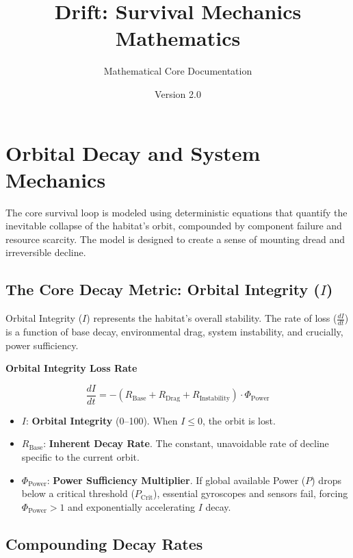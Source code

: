 \documentclass{article}
\title{\color{DeepVoid}\textbf{Drift: Survival Mechanics Mathematics}}
\author{\large Mathematical Core Documentation}
\date{Version 2.0}
\newenvironment{mathbox}[1][\unskip]{
    \begin{tcolorbox}
    \textbf{#1}
}{
    \end{tcolorbox}
}
\begin{document}
\maketitle
\thispagestyle{empty} %

\section*{Orbital Decay and System Mechanics}

The core survival loop is modeled using deterministic equations that quantify the inevitable collapse of the habitat's orbit, compounded by component failure and resource scarcity. The model is designed to create a sense of mounting dread and irreversible decline.

\subsection{The Core Decay Metric: Orbital Integrity ($I$)}\hspace{0.5em}

Orbital Integrity ($I$) represents the habitat's overall stability. The rate of loss ($\frac{dI}{dt}$) is a function of base decay, environmental drag, system instability, and crucially, power sufficiency.

\begin{mathbox}[\color{DeepVoid}Orbital Integrity Loss Rate]
$$
\frac{dI}{dt} = - (R_{\text{Base}} + R_{\text{Drag}} + R_{\text{Instability}}) \cdot \Phi_{\text{Power}}
$$
\end{mathbox}

\begin{itemize}
    \item $I$: \textbf{Orbital Integrity} (0--100). When $I \le 0$, the orbit is lost.
    \item $R_{\text{Base}}$: \textbf{Inherent Decay Rate}. The constant, unavoidable rate of decline specific to the current orbit.
    \item $\Phi_{\text{Power}}$: \textbf{Power Sufficiency Multiplier}. If global available Power ($P$) drops below a critical threshold ($P_{\text{Crit}}$), essential gyroscopes and sensors fail, forcing $\Phi_{\text{Power}} > 1$ and exponentially accelerating $I$ decay.
\end{itemize}

\vspace{1em}
\subsection{Compounding Decay Rates}\hspace{0.5em}
\end{document}
